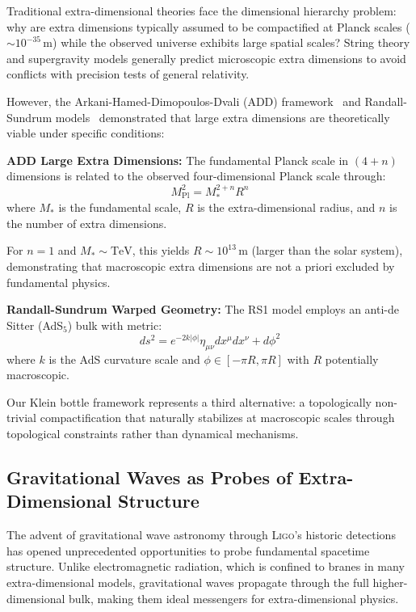 \documentclass[reprint,amsmath,amssymb,aps,prd]{revtex4-2}
\newcommand{\LIGO}{\textsc{Ligo}\xspace}
\begin{document}
Traditional extra-dimensional theories face the dimensional hierarchy problem: why are extra dimensions typically assumed to be compactified at Planck scales ($\sim 10^{-35}\,\text{m}$) while the observed universe exhibits large spatial scales? String theory and supergravity models generally predict microscopic extra dimensions to avoid conflicts with precision tests of general relativity.

However, the Arkani-Hamed-Dimopoulos-Dvali (ADD) framework~\cite{ArkaniHamed1998} and Randall-Sundrum models~\cite{Randall1999} demonstrated that large extra dimensions are theoretically viable under specific conditions:

\textbf{ADD Large Extra Dimensions:}
The fundamental Planck scale in $(4+n)$ dimensions is related to the observed four-dimensional Planck scale through:
\begin{equation}
M_{\text{Pl}}^2 = M_*^{2+n} R^n
\label{eq:add_relation}
\end{equation}
where $M_*$ is the fundamental scale, $R$ is the extra-dimensional radius, and $n$ is the number of extra dimensions.

For $n = 1$ and $M_* \sim \text{TeV}$, this yields $R \sim 10^{13}\,\text{m}$ (larger than the solar system), demonstrating that macroscopic extra dimensions are not a priori excluded by fundamental physics.

\textbf{Randall-Sundrum Warped Geometry:}
The RS1 model employs an anti-de Sitter (AdS$_5$) bulk with metric:
\begin{equation}
ds^2 = e^{-2k|\phi|}\eta_{\mu\nu} dx^\mu dx^\nu + d\phi^2
\label{eq:rs_metric}
\end{equation}
where $k$ is the AdS curvature scale and $\phi \in [-\pi R, \pi R]$ with $R$ potentially macroscopic.

Our Klein bottle framework represents a third alternative: a topologically non-trivial compactification that naturally stabilizes at macroscopic scales through topological constraints rather than dynamical mechanisms.

\subsection{Gravitational Waves as Probes of Extra-Dimensional Structure}

The advent of gravitational wave astronomy through \LIGO's historic detections~\cite{Abbott2016observation,Abbott2021gwtc3} has opened unprecedented opportunities to probe fundamental spacetime structure. Unlike electromagnetic radiation, which is confined to branes in many extra-dimensional models, gravitational waves propagate through the full higher-dimensional bulk, making them ideal messengers for extra-dimensional physics.
\end{document}
